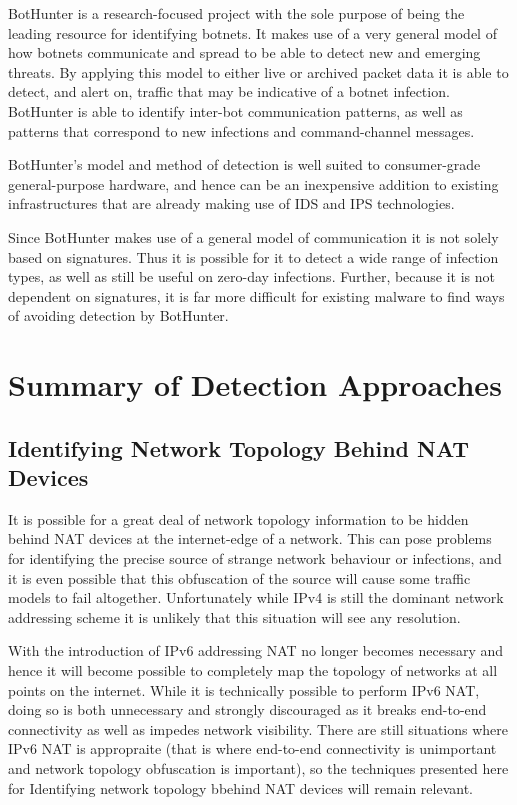 \documentclass{article}
\theoremstyle{remark}
\theoremstyle{definition}
\theoremstyle{definition}
\theoremstyle{definition}
\begin{document}
BotHunter is a research-focused project with the sole purpose of being the leading resource for identifying botnets. It makes use of a very general model of how botnets communicate and spread to be able to detect new and emerging threats. By applying this model to either live or archived packet data it is able to detect, and alert on, traffic that may be indicative of a botnet infection. BotHunter is able to identify inter-bot communication patterns, as well as patterns that correspond to new infections and command-channel messages.

BotHunter's model and method of detection is well suited to consumer-grade general-purpose hardware, and hence can be an inexpensive addition to existing infrastructures that are already making use of IDS and IPS technologies.

Since BotHunter makes use of a general model of communication it is not solely based on signatures. Thus it is possible for it to detect a wide range of infection types, as well as still be useful on zero-day infections. Further, because it is not dependent on signatures, it is far more difficult for existing malware to find ways of avoiding detection by BotHunter.

\section{Summary of Detection Approaches}

\subsection{Identifying Network Topology Behind NAT Devices}
It is possible for a great deal of network topology information to be hidden behind NAT devices at the internet-edge of a network. This can pose problems for identifying the precise source of strange network behaviour or infections, and it is even possible that this obfuscation of the source will cause some traffic models to fail altogether. Unfortunately while IPv4 is still the dominant network addressing scheme it is unlikely that this situation will see any resolution.

With the introduction of IPv6 addressing NAT no longer becomes necessary and hence it will become possible to completely map the topology of networks at all points on the internet. While it is technically possible to perform IPv6 NAT, doing so is both unnecessary and strongly discouraged as it breaks end-to-end connectivity as well as impedes network visibility. There are still situations where IPv6 NAT is appropraite (that is where end-to-end connectivity is unimportant and network topology obfuscation is important), so the techniques presented here for Identifying network topology bbehind NAT devices will remain relevant.
\end{document}

